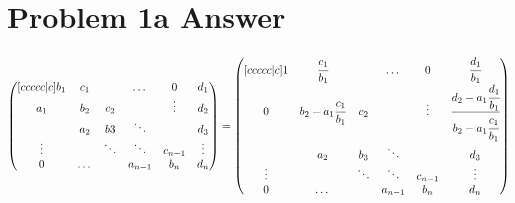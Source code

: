 \documentclass{article}
\begin{document}
    \section*{Problem 1a Answer}
    \begin{equation*}
        \begin{aligned}
            \begin{pmatrix}[ccccc|c]
                b_1 & c_1 &  & \dots & 0 & d_1\\ 
                a_1 & b_2 & c_2 & & \vdots & d_2\\
                & a_2 & b3 & \ddots & & d_3\\
                \vdots & & \ddots & \ddots & c_{n-1} & \vdots\\
                0 & \dots & & a_{n-1} & b_n & d_n\\
            \end{pmatrix}
            &=
            \begin{pmatrix}[ccccc|c]
                1 & \cfrac{c_{1}}{b_1} &  & \dots & 0 & \cfrac{d_{1}}{b_1}\\  
                0 & b_2 - a_{1}\cfrac{c_{1}}{b_1} & c_2 & & \vdots & \cfrac{d_2 - a_{1}\cfrac{d_{1}}{b_1}}{b_2 - a_{1}\cfrac{c_{1}}{b_1}}\\
                & a_2 & b_3 & \ddots & & d_3\\
                \vdots & & \ddots & \ddots & c_{n-1} & \vdots\\
                0 & \dots & & a_{n-1} & b_n & d_n\\
            \end{pmatrix}\\

\end{aligned}
\end{equation*}
\end{document}
